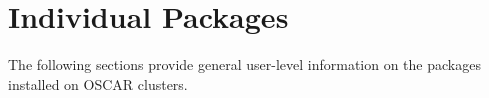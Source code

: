 %
%
%

\section{Individual Packages}
\label{sec:individual-packages}

The following sections provide general user-level information on the
packages installed on OSCAR clusters.

